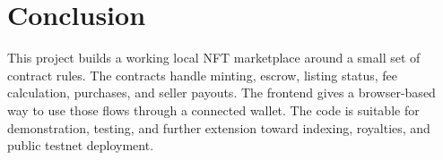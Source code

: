 \documentclass[11pt,a4paper]{article}
\begin{document}
\section{Conclusion}

This project builds a working local NFT marketplace around a small set of contract rules. The contracts handle minting, escrow, listing status, fee calculation, purchases, and seller payouts. The frontend gives a browser-based way to use those flows through a connected wallet. The code is suitable for demonstration, testing, and further extension toward indexing, royalties, and public testnet deployment.
\end{document}
